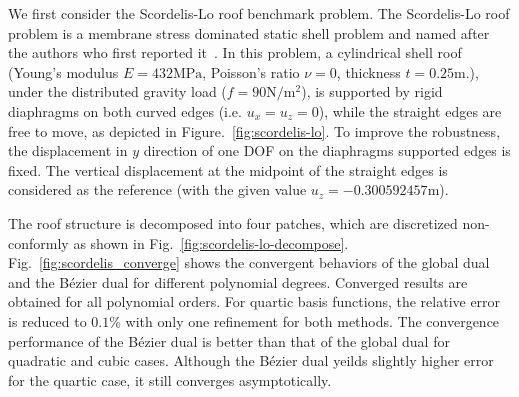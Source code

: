 \documentclass[preprint,12pt]{elsarticle}
\newcommand{\Bezier}{{B\'{e}zier} }
\theoremstyle{remark}
\begin{document}
We first consider the Scordelis-Lo roof benchmark problem. The Scordelis-Lo roof problem is a membrane stress dominated static shell problem and named after the authors who first reported it~\cite{scordelis1964computer}. In this problem, a cylindrical shell roof (Young's modulus $E=432\text{MPa}$, Poisson's ratio $\nu = 0$, thickness $t = 0.25\text{m}$.), under the distributed gravity load ($f = 90\text{N}/\text{m}^2$), is supported by rigid diaphragms on both curved edges (i.e. $u_{x}=u_z=0$), while the straight edges are free to move, as depicted in Figure.~\ref{fig:scordelis-lo}. To improve the robustness, the displacement in $y$ direction of one DOF on the diaphragms supported edges is fixed. The vertical displacement at the midpoint of the straight edges is considered as the reference (with the given value $u_z=-0.300592457\text{m}$).\par

The roof structure is decomposed into four patches, which are discretized non-conformly as shown in Fig.~\ref{fig:scordelis-lo-decompose}. Fig.~\ref{fig:scordelis_converge} shows the convergent behaviors of the global dual and the \Bezier dual for different polynomial degrees. Converged results are obtained for all polynomial orders. For quartic basis functions, the relative error is reduced to $0.1\%$ with only one refinement for both methods. The convergence performance of the \Bezier dual is better than that of the global dual for quadratic and cubic cases. Although the \Bezier dual yeilds slightly higher error for the quartic case, it still converges asymptotically. \par
\end{document}
